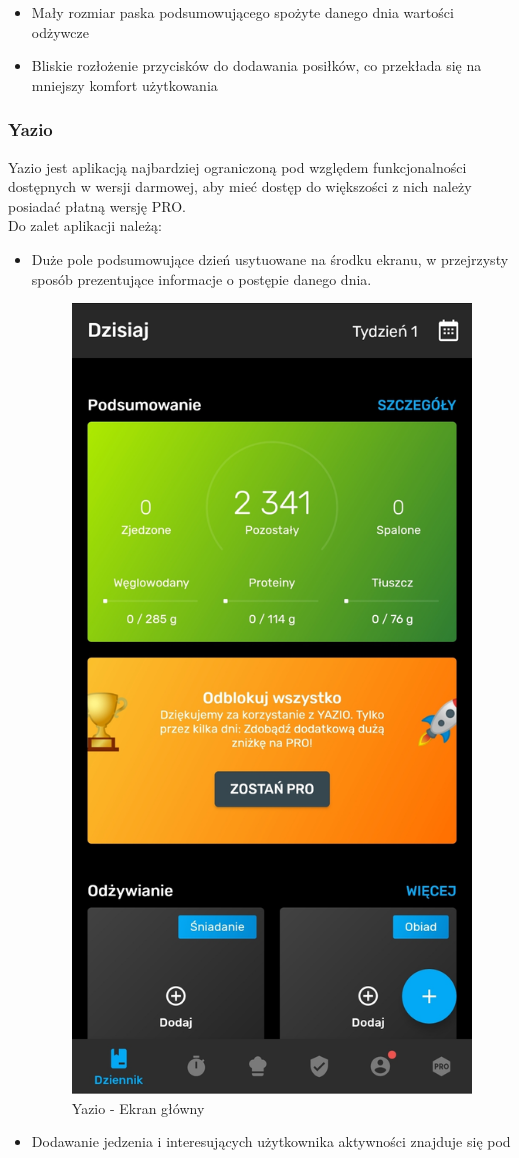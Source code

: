 \documentclass[12pt, a4paper]{article}
\begin{document}
\begin{sloppypar}
{{{\begin{itemize}
\begin{figure}[H]
          \caption{Fitatu - Ekran zawierający banery informacyjne}
          \label{fig:fit4}
        \end{figure}
        \item Mały rozmiar paska podsumowującego spożyte danego dnia wartości odżywcze
        \item Bliskie rozłożenie przycisków do dodawania posiłków, co przekłada się na
        mniejszy komfort użytkowania        
      \end{itemize}
    }
    \subsubsection{Yazio}
    {
      Yazio jest aplikacją najbardziej ograniczoną pod względem funkcjonalności dostępnych
      w wersji darmowej, aby mieć dostęp do większości z nich należy posiadać płatną wersję
      PRO.\\
      Do zalet aplikacji należą:
      \begin{itemize}
        \item Duże pole podsumowujące dzień usytuowane na środku ekranu, w przejrzysty
        sposób prezentujące informacje o postępie danego dnia.
        \begin{figure}[H]
          \centering
          \includegraphics[width=.4\textwidth]{yazio_1.jpg}
          \caption{Yazio - Ekran główny}
          \label{fig:yaz1}
        \end{figure}
        \item Dodawanie jedzenia i interesujących użytkownika aktywności znajduje się pod

\end{itemize}}}}
\end{sloppypar}
\end{document}
